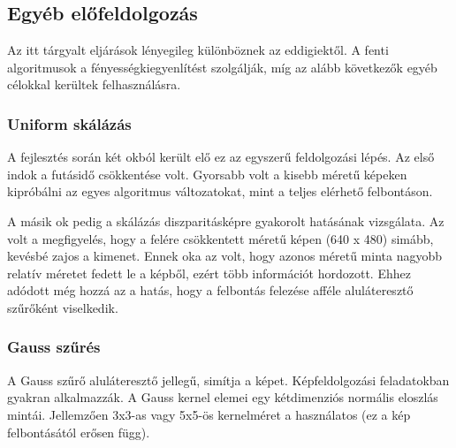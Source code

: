 \subsection{Egyéb előfeldolgozás}\label{sect:miscPreproc}

Az itt tárgyalt eljárások lényegileg különböznek az eddigiektől.
A fenti algoritmusok a fényességkiegyenlítést szolgálják, míg az alább következők egyéb célokkal kerültek felhasználásra.

\subsubsection{Uniform skálázás}\label{sect:scale}

A fejlesztés során két okból került elő ez az egyszerű feldolgozási lépés.
Az első indok a futásidő csökkentése volt.
Gyorsabb volt a kisebb méretű képeken kipróbálni az egyes algoritmus változatokat, mint a teljes elérhető felbontáson.

A másik ok pedig a skálázás diszparitásképre gyakorolt hatásának vizsgálata.
Az volt a megfigyelés, hogy a felére csökkentett méretű képen (640 x 480) simább, kevésbé zajos a kimenet.
Ennek oka az volt, hogy azonos méretű minta nagyobb relatív méretet fedett le a képből, ezért több információt hordozott.
Ehhez adódott még hozzá az a hatás, hogy a felbontás felezése afféle aluláteresztő szűrőként viselkedik.

\subsubsection{Gauss szűrés}\label{sect:gaussian}

A Gauss szűrő aluláteresztő jellegű, simítja a képet.
Képfeldolgozási feladatokban gyakran alkalmazzák.
A Gauss kernel elemei egy kétdimenziós normális eloszlás mintái.
Jellemzően 3x3-as vagy 5x5-ös kernelméret a használatos (ez a kép felbontásától erősen függ).

